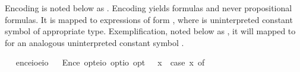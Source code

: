\begin{isabellebody}
\begin{isamarkuptext}
  Encoding  is noted below as .
  Encoding yields formulas and never propositional formulas. It is mapped to expressions of 
  form , where  is uninterpreted constant symbol of appropriate 
  type. Exemplification, noted below as , it will mapped to 
  for an analogous uninterpreted constant symbol . 
\end{isamarkuptext}%
\isamarkuptrue%
\ \isamarkupfalse%
\ enc{\isacharcolon}{\isacharcolon}{\isachardoublequoteopen}{\isacharparenleft}e{\isasymRightarrow}io{\isacharparenright}{\isasymRightarrow}e{\isasymRightarrow}io{\isachardoublequoteclose}\isanewline
\ \isamarkupfalse%
\ Enc{\isacharcolon}{\isacharcolon}{\isachardoublequoteopen}e\ opt{\isasymRightarrow}{\isacharparenleft}e{\isasymRightarrow}io{\isacharparenright}\ opt{\isasymRightarrow}io\ opt{\isachardoublequoteclose}\ {\isacharparenleft}{\isachardoublequoteopen}{\isasymlbrace}{\isacharunderscore}{\isacharcomma}{\isacharunderscore}{\isasymrbrace}{\isachardoublequoteclose}{\isacharparenright}\ \ {\isachardoublequoteopen}{\isasymlbrace}x{\isacharcomma}{\isasymPhi}{\isasymrbrace}\ {\isasymequiv}\ case\ {\isacharparenleft}x{\isacharcomma}{\isasymPhi}{\isacharparenright}\ of\ \isanewline

\end{isabellebody}
